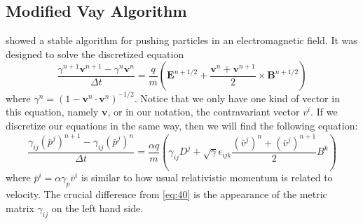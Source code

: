\subsection{Modified Vay Algorithm}
\label{sec:Vay-mod}

\citet{vay_simulation_2008}
showed a stable algorithm for pushing particles in an electromagnetic
field. It was designed to solve the discretized equation
\begin{equation}
  \label{eq:40}
  \frac{\gamma^{n+1}\mathbf{v}^{n+1} - \gamma^n\mathbf{v}^n}{\Delta t} = \frac{q}{m}\left( \mathbf{E}^{n+1/2} + \frac{\mathbf{v}^n + \mathbf{v}^{n+1}}{2}\times \mathbf{B}^{n+1/2} \right)
\end{equation}
where $\gamma^n = (1 - \mathbf{v}^n\cdot \mathbf{v}^n)^{-1/2}$. Notice that we
only have one kind of vector in this equation, namely $\mathbf{v}$, or in our
notation, the contravariant vector $v^i$. If we discretize our equations in the
same way, then we will find the following equation:
\begin{equation}
  \label{eq:41}
  \frac{\gamma_{ij}(\bar{p}^j)^{n+1} - \gamma_{ij}(\bar{p}^j)^n}{\Delta t} = \frac{\alpha q}{m}\left( \gamma_{ij}D^j + \sqrt{\gamma}\epsilon_{ijk}\frac{(\bar{v}^j)^n + (\bar{v}^j)^{n+1}}{2}B^k \right)
\end{equation}
where $\bar{p}^i = \alpha\gamma_p\bar{v}^i$ is similar to how usual relativistic
momentum is related to velocity. The crucial difference from \eqref{eq:40} is
the appearance of the metric matrix $\gamma_{ij}$ on the left hand side.

